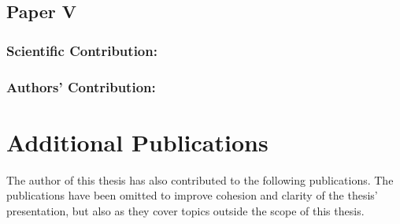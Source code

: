 \clearpage %

\subsection*{Paper V}%
%
\begin{quote}
\end{quote}

\subsubsection*{Scientific Contribution:}%
%
\subsubsection*{Authors' Contribution:}%
%


\clearpage %

\section{Additional Publications}%
\label{sec:additional-publications}%
%
The author of this thesis has also contributed to the following publications.
The publications have been omitted to improve cohesion and clarity of the thesis' presentation, but also as they cover topics outside the scope of this thesis.

\begin{quote}
\end{quote}

\begin{quote}
\end{quote}

\begin{quote}
\end{quote}

\begin{quote}
\end{quote}

\begin{quote}
\end{quote}
